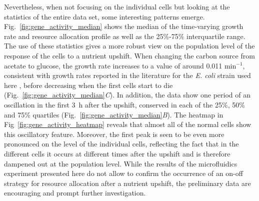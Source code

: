Nevertheless, when not focusing on the individual cells but looking at the statistics of the entire data set, some interesting patterns emerge. 
Fig.~\ref{fig:gene_activity_median} shows the median of the time-varying growth rate and resource allocation profile as well as the 25\%-75\% interquartile range. 
The use of these statistics gives a more robust view on the population level of the response of the cells to a nutrient upshift. 
When changing the carbon source from acetate to glucose, the growth rate increases to a value of around 0.011 min$^{-1}$, consistent with growth rates reported in the literature for the \textit{E. coli} strain used here \cite{Volkmer/Heinemann,Izard}, before decreasing when the first cells start to die (Fig.~\ref{fig:gene_activity_median}\textit{C}).
In addition, the data show one period of an oscillation in the first 3~h after the upshift, conserved in each of the 25\%, 50\% and 75\% quartiles (Fig.~\ref{fig:gene_activity_median}\textit{B}).
The heatmap in Fig~\ref{fig:gene_activity_heatmap} reveals that almost all of the normal cells show this oscillatory feature.
Moreover, the first peak is seen to be even more pronounced on the level of the individual cells, reflecting the fact that in the different cells it occurs at different times after the upshift and is therefore dampened out at the population level.
While the results of the microfluidics experiment presented here do not allow to confirm the occurrence of an on-off strategy for resource allocation after a nutrient upshift, the preliminary data are encouraging and prompt further investigation.

